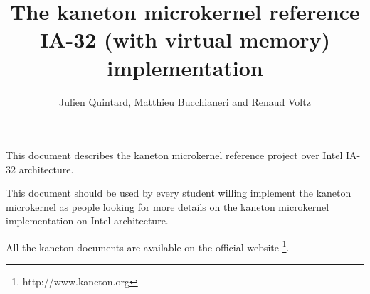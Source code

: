 
%
%



%
%


%
%

\title{The kaneton microkernel reference\\IA-32 (with virtual memory)
	implementation
       \logos}

%
%

\author{\small{Julien Quintard},
        \small{Matthieu Bucchianeri} and
        \small{Renaud Voltz}}

%
%



%
%

\maketitle

%
%

This document describes the kaneton microkernel reference project over
Intel IA-32 architecture.

This document should be used by every student willing implement the
kaneton microkernel as people looking for more details on the kaneton
microkernel implementation on Intel architecture.

All the kaneton documents are available on
the official website
  \footnote{http://www.kaneton.org}.

%
%

\tableofcontents

%
%










